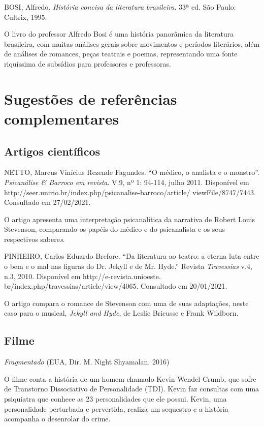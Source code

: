 \documentclass[12pt]{extarticle}
\begin{document}
{BOSI, Alfredo. \emph{História concisa da literatura brasileira}. 33ª ed.
São Paulo: Cultrix, 1995.

O livro do professor Alfredo Bosi é uma história panorâmica da
literatura brasileira, com muitas análises gerais sobre movimentos e
períodos literários, além de análises de romances, peças teatrais e
poemas, representando uma fonte riquíssima de subsídios para professores
e professoras.

\section{Sugestões de referências complementares}\label{sugestoes}

\subsection{Artigos científicos}

NETTO, Marcus Vinícius Rezende Fagundes. ``O médico, o analista e o
monstro''. \emph{Psicanálise \& Barroco em revista}. V.9, nº 1: 94-114,
julho 2011. Disponível em
http://seer.unirio.br/index.php/psicanalise-barroco/article/
viewFile/8747/7443. Consultado em 27/02/2021.

O artigo apresenta uma interpretação psicanalítica da narrativa de
Robert Louis Stevenson, comparando os papéis do médico e do psicanalista
e os seus respectivos sabere\emph{s}.

PINHEIRO, Carlos Eduardo Brefore. ``Da literatura ao teatro: a eterna
luta entre o bem e o mal nas figuras do Dr. Jekyll e de Mr. Hyde.''
Revista \emph{Travessias} v.4, n.3, 2010. Disponível em
http://e-revista.unioeste. br/index.php/travessias/article/view/4065.
Consultado em 20/01/2021.

O artigo compara o romance de Stevenson com uma de suas adaptações,
neste caso para o musical, \emph{Jekyll and Hyde}, de Leslie Bricusse e
Frank Wildborn.

\subsection{Filme}

\emph{Fragmentado} (EUA, Dir. M. Night Shyamalan, 2016)

O filme conta a história de um homem chamado Kevin Wendel Crumb, que
sofre de Transtorno Dissociativo de Personalidade (TDI). Kevin faz
consultas com uma psiquiatra que conhece as 23 personalidades que ele
possui. Kevin, uma personalidade perturbada e pervertida, realiza um
sequestro e a história acompanha o desenrolar do crime.

}
\end{document}
